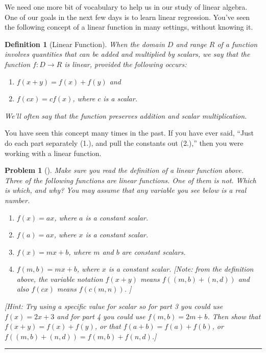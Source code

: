 \documentclass[letterpaper,oneside]{book}%
\theoremstyle{plain}
\theoremstyle{box}
\newtheorem{definition}[theorem]{Definition}
\theoremstyle{problem}
\newtheorem{problemnum}{Problem}[chapter]
\newenvironment{problem}[1][]{\begin{problemnum}[#1]}{\end{problemnum}\nopagebreak\hrule\bigskip}
\begin{document}
We need one more bit of vocabulary to help us in our study of linear algebra. One of our goals in the next few days is to learn linear regression. You've seen the following concept of a linear function in many settings, without knowing it. 
\begin{definition}[Linear Function]
 When the domain $D$ and range $R$ of a function involves quantities that can be added and multiplied by scalars, we say that the function $f:D\to R$ is linear, provided the following occurs:
\begin{enumerate}
 \item $f(x+y) = f(x)+f(y)$ and
 \item $f(cx)=cf(x)$, where $c$ is a scalar. 
\end{enumerate}
We'll often say that the function preserves addition and scalar multiplication.
\end{definition}
You have seen this concept many times in the past. If you have ever said, ``Just do each part separately (1.), and pull the constants out (2.),'' then you were working with a linear function.


\begin{problem}
 Make sure you read the definition of a linear function above. 
 Three of the following functions are linear functions.  One of them is not.  Which is which, and why?  You may assume that any variable you see below is a real number. 
 \begin{enumerate}
  \item $f(x)=ax$, where $a$ is a constant scalar.
  \item $f(a)=ax$, where $x$ is a constant scalar. 
  \item $f(x)=mx+b$, where $m$ and $b$ are constant scalars. 
  \item $f(m,b)=mx+b$, where $x$ is a constant scalar. [Note: from the definition above, the variable notation $f(x+y)$ means $f( (m,b)+(n,d))$ and also $f(cx)$ means $f(c(m,n))$. ]
 \end{enumerate}
[Hint: Try using a specific value for scalar so for part 3 you could use $f(x) = 2x+3$ and for part 4 you could use $f(m,b) = 2m+b$. Then show that $f(x+y)=f(x)+f(y)$, or that $f(a+b)=f(a)+f(b)$, or $f((m,b)+(n,d)) =f(m,b)+f(n,d)$.]
\end{problem}
\end{document}
